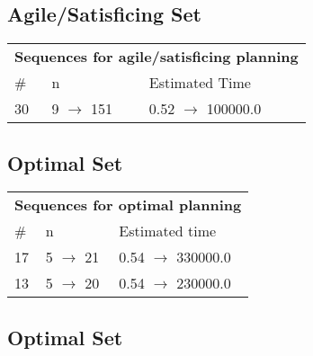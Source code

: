 \documentclass{article}
\begin{document}
                         \subsection*{Agile/Satisficing Set}

                        \begin{center}
                        \begin{tabular}{@{}l|l|l@{}}
                        \multicolumn{3}{c}{\bf \large Sequences for agile/satisficing planning}\\
                        \# & n & Estimated Time\\\midrule
                        30&9 $\rightarrow$ 151&0.52 $\rightarrow$ 100000.0
                        \end{tabular}
                        \end{center}
                    
                            \subsection*{Optimal Set}

                            \begin{center}
                            \begin{tabular}{@{}l|l|l@{}}
                            \multicolumn{3}{c}{\bf \large Sequences for optimal planning}\\
                            \# & n & Estimated time\\\midrule
                            17&5 $\rightarrow$ 21&0.54 $\rightarrow$ 330000.0\\
13&5 $\rightarrow$ 20&0.54 $\rightarrow$ 230000.0
                            \end{tabular}
                            \end{center}
                    
                                \subsection*{Optimal Set}
                                
\end{document}
